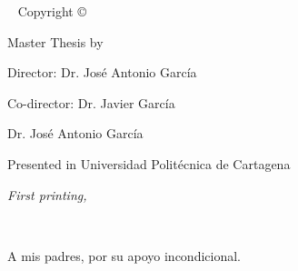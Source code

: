 \newpage
\begin{fullwidth}
~\vfill
\thispagestyle{empty}
\setlength{\parindent}{0pt}
\setlength{\parskip}{.5\baselineskip}
\textsf{Copyright \copyright\ \monthyear\ \thanklessauthor}
\par\textsf{Master Thesis by \thanklessauthor}
\par\textsf{Director: Dr. José Antonio García}
\par\textsf{Co-director: Dr. Javier García}  
\par\textsf{\hspace{1.8cm} Dr. José Antonio García}
\par\textsf{Presented in Universidad Politécnica de Cartagena}
\par\textit{First printing, \monthyear}
\end{fullwidth}

\cleardoublepage
~\vfill
\begin{doublespace}
\noindent%
\nohyphenation
A mis padres, por su apoyo incondicional.
\end{doublespace}
\vfill
\vfill


\tableofcontents %


\listoffigures %


\listoftables %



